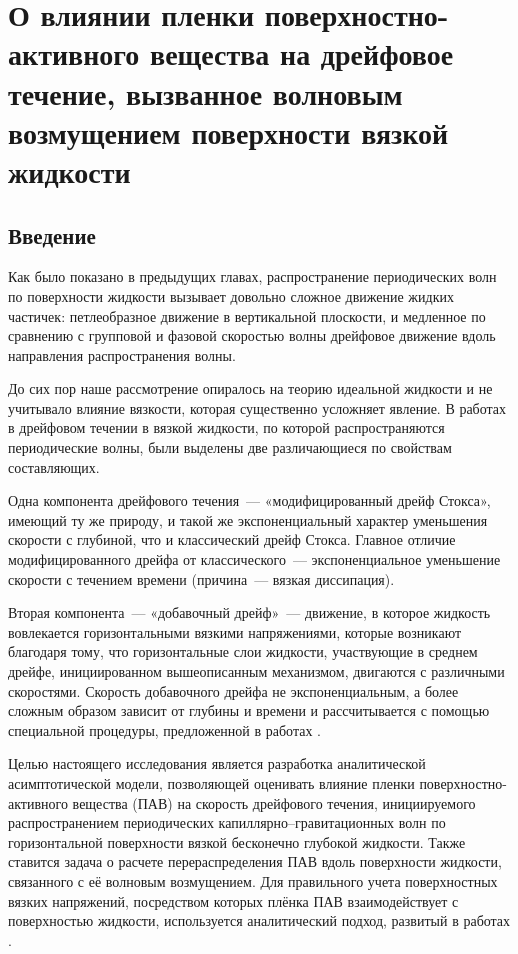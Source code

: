 \chapter{О влиянии пленки  поверхностно-активного вещества на дрейфовое течение, вызванное волновым возмущением поверхности вязкой жидкости} \label{ch:ch4}

\section{Введение} \label{ch:ch4/sect1}

Как было показано в предыдущих главах, распространение периодических волн по поверхности жидкости вызывает довольно сложное движение жидких частичек: петлеобразное движение в вертикальной плоскости, и медленное по сравнению с групповой и фазовой скоростью волны дрейфовое движение вдоль направления распространения волны.

До сих пор наше рассмотрение опиралось на теорию идеальной жидкости и не учитывало влияние вязкости, которая существенно усложняет явление. В работах \parencite{BelonozhkoZHTF,Belonozhko2010} в дрейфовом течении в вязкой жидкости, по которой распространяются периодические волны, были выделены две различающиеся по свойствам составляющих.

Одна компонента дрейфового течения~--- «модифицированный дрейф Стокса», имеющий ту же природу, и такой же экспоненциальный характер уменьшения скорости с глубиной, что и классический дрейф Стокса. Главное отличие модифицированного дрейфа от классического~--- экспоненциальное уменьшение скорости с течением времени (причина~--- вязкая диссипация). 

Вторая компонента~--- «добавочный дрейф»~--- движение, в которое жидкость вовлекается горизонтальными вязкими напряжениями, которые возникают благодаря тому, что горизонтальные слои жидкости, участвующие в среднем дрейфе, инициированном вышеописанным механизмом, двигаются с различными скоростями. Скорость добавочного дрейфа не экспоненциальным, а более сложным образом зависит от глубины и времени и рассчитывается с помощью специальной процедуры, предложенной в работах \parencite{BelonozhkoZHTF,Belonozhko2010}.

Целью настоящего исследования является разработка аналитической асимптотической модели, позволяющей оценивать влияние пленки поверхностно-активного вещества (ПАВ) на скорость дрейфового течения, инициируемого распространением периодических капиллярно--гравитационных волн по горизонтальной поверхности вязкой бесконечно глубокой жидкости. Также ставится задача о расчете перераспределения ПАВ вдоль поверхности жидкости, связанного с её волновым возмущением. Для правильного учета поверхностных вязких напряжений, посредством которых плёнка ПАВ взаимодействует с поверхностью жидкости, используется аналитический подход, развитый в работах \parencite{BelonozhkoZHTF,Belonozhko2010}.

